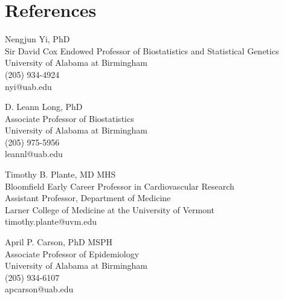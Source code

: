 \section{References}
\begin{lonelist}
    \item Nengjun Yi, PhD\\
    Sir David Cox Endowed Professor of Biostatistics and Statistical Genetics\\
    University of Alabama at Birmingham\\
    (205) 934-4924\\
    nyi@uab.edu

	\item D. Leann Long, PhD\\
	Associate Professor of Biostatistics\\
    University of Alabama at Birmingham\\
	(205) 975-5956\\
	leannl@uab.edu

	\item Timothy B. Plante, MD MHS\\
	Bloomfield Early Career Professor in Cardiovascular Research\\
    Assistant Professor, Department of Medicine\\
    Larner College of Medicine at the University of Vermont\\
    timothy.plante@uvm.edu

	\item April P. Carson, PhD MSPH\\
	Associate Professor of Epidemiology\\
	University of Alabama at Birmingham\\
	(205) 934-6107\\
	apcarson@uab.edu
\end{lonelist}